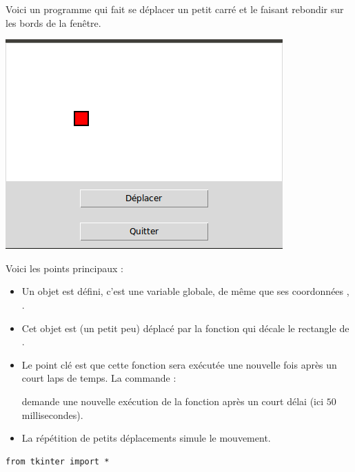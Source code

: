 \documentclass[11pt,class=report,crop=false]{standalone}
\begin{document}
\begin{cours}


Voici un programme qui fait se déplacer un petit carré et le faisant rebondir sur les bords de la fenêtre.

\begin{center}
\includegraphics[scale=\myscale,scale=0.5]{ecran-alea-cours-mouv}
\end{center}

Voici les points principaux :
\begin{itemize}
  \item Un objet  est défini, c'est une variable globale, de même que ses coordonnées , .
  
  \item Cet objet est (un petit peu) déplacé par la fonction  qui décale le rectangle de .
    
  \item Le point clé est que cette fonction sera exécutée une nouvelle fois après un court laps de temps. La commande :
  
  \centerline{}
  
  demande une nouvelle exécution de la fonction  après un court délai (ici $50$ millisecondes).
  
  \item La répétition de petits déplacements simule le mouvement.
\end{itemize}

\begin{lstlisting}
from tkinter import *


\end{lstlisting}
\end{cours}
\end{document}
